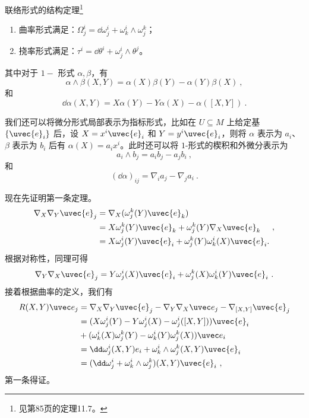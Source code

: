\begin{theorem}{联络形式的结构定理\footnote{见\cite{GTM275}第85页的定理11.7。}}\label{the_ConFom_2}
\begin{enumerate}
\item 曲率形式满足：$\Omega^i_j=\dd \omega^i_j+\omega^i_k\wedge\omega^k_j$；
\item 挠率形式满足：$\tau^i=\dd\theta^i+\omega^i_j\wedge\theta^j$。
\end{enumerate}

其中对于 $1-$ 形式 $\alpha, \beta$，有
\begin{equation}
\alpha\wedge \beta(X, Y)=\alpha(X)\beta(Y)-\alpha(Y)\beta(X)~,
\end{equation}
和
\begin{equation}
\dd \alpha(X, Y)=X\alpha(Y)-Y\alpha(X)-\alpha([X, Y])~.
\end{equation}

我们还可以将微分形式局部表示为指标形式，比如在 $U\subseteq M$ 上给定基 $\{\uvec{e}_i\}$ 后，设 $X=x^i\uvec{e}_i$ 和 $Y=y^i\uvec{e}_i$，则将 $\alpha$ 表示为 $a_i$、$\beta$ 表示为 $b_i$ 后有 $\alpha(X)=a_ix^i$。此时还可以将 $1$-形式的楔积和外微分表示为
\begin{equation}
a_i\wedge b_j=a_ib_j-a_jb_i~,
\end{equation}
和
\begin{equation}
(\dd \alpha)_{ij}=\nabla_{i}a_j-\nabla_{j}a_i~.
\end{equation}
\end{theorem}



现在先证明第一条定理。
\begin{equation}
\begin{aligned}
\nabla_X\nabla_Y\uvec{e}_j& =\nabla_X(\omega_j^k(Y)\uvec{e}_k) \\
&=X\omega_j^k(Y)\uvec{e}_k+\omega_j^k(Y)\nabla_X\uvec{e}_k \\
&=X\omega_j^i(Y)\uvec{e}_i+\omega_j^k(Y)\omega_k^i(X)\uvec{e}_i.
\end{aligned}~,
\end{equation}
根据对称性，同理可得
\begin{equation}
\nabla_Y\nabla_X\uvec{e}_j =Y\omega_j^i(X)\uvec{e}_i+\omega_j^k(X)\omega_k^i(Y)\uvec{e}_i~.
\end{equation}
接着根据曲率的定义，我们有
\begin{equation}
\begin{aligned}
R(X,Y)\uvec e_j& =\nabla_X\nabla_Y\uvec{e}_j-\nabla_Y\nabla_X\uvec e_j-\nabla_{[X,Y]}\uvec{e}_j \\
&=(X\omega_j^i(Y)-Y\omega_j^i(X)-\omega_j^i([X,Y]))\uvec{e}_i \\
&+(\omega_k^i(X)\omega_j^k(Y)-\omega_k^i(Y)\omega_j^k(X))\uvec e_i \\
&=\dd\omega_j^i(X,Y)e_i+\omega_k^i\wedge\omega_j^k(X,Y)\uvec{e}_i \\
&=(\dd\omega_j^i+\omega_k^i\wedge\omega_j^k)(X,Y)\uvec{e}_i~,
\end{aligned}
\end{equation}
第一条得证。

